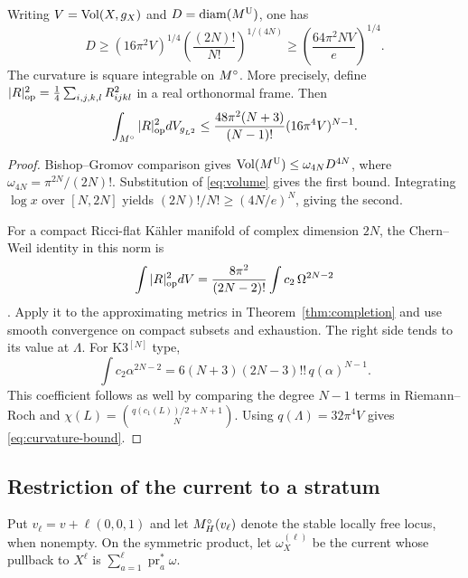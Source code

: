 \begin{corollary}\label{cor:bounds}
Writing $V=\operatorname{Vol}(X,g_X)$ and $D=\operatorname{diam}(M^{\mathrm U})$, one has
\begin{equation}\label{eq:diameter}
 D\ge (16\pi^2V)^{1/4}
       \left(\frac{(2N)!}{N!}\right)^{1/(4N)}
   \ge \left(\frac{64\pi^2NV}{e}\right)^{1/4}.
\end{equation}
The curvature is square integrable on $M^{\circ}$. More precisely, define
$|R|_{\rm op}^2=\frac14\sum_{i,j,k,l}R_{ijkl}^2$ in a real orthonormal
frame. Then
\begin{equation}\label{eq:curvature-bound}
 \int_{M^{\circ}}|R|_{\rm op}^2dV_{g_{L^2}}
 \le \frac{48\pi^2(N+3)}{(N-1)!}(16\pi^4V)^{N-1}.
\end{equation}
\end{corollary}
\begin{proof}
Bishop--Gromov comparison gives
$\operatorname{Vol}(M^{\mathrm U})\le\omega_{4N}D^{4N}$, where
$\omega_{4N}=\pi^{2N}/(2N)!$. Substitution of \eqref{eq:volume} gives
the first bound. Integrating $\log x$ over $[N,2N]$ yields
$(2N)!/N!\ge(4N/e)^N$, giving the second.

For a compact Ricci-flat K\"ahler manifold of complex dimension $2N$, the
Chern--Weil identity in this norm is
\[
 \int |R|_{\rm op}^2dV
 =\frac{8\pi^2}{(2N-2)!}\int c_2\,\Omega^{2N-2}
\]
\cite[formula following (8)]{HS01}.
Apply it to the approximating metrics in Theorem~\ref{thm:completion}
and use smooth convergence on compact subsets and exhaustion. The
right side tends to its value at $\Lambda$.
For K3$^{[N]}$ type,
\[
 \int c_2\alpha^{2N-2}
 =6(N+3)(2N-3)!!\,q(\alpha)^{N-1}.
\]
This coefficient follows as well by comparing the degree $N-1$ terms in
Riemann--Roch and
$\chi(L)=\binom{q(c_1(L))/2+N+1}{N}$.
Using $q(\Lambda)=32\pi^4V$ gives \eqref{eq:curvature-bound}.
\end{proof}

\subsection{Restriction of the current to a stratum}
Put $v_\ell=v+\ell(0,0,1)$ and let $M^{\circ}_H(v_\ell)$ denote the stable
locally free locus, when nonempty. On the symmetric product, let
$\omega_X^{(\ell)}$ be the current whose pullback to $X^\ell$ is
$\sum_{a=1}^\ell\operatorname{pr}_a^*\omega$.


